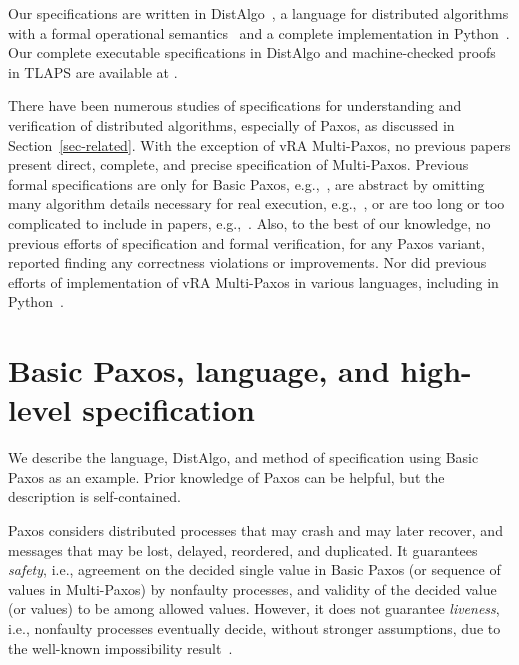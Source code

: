 \documentclass[11pt]{article}
\newcommand{\defn}[1]{\textit{#1}} %
\newcommand{\mysec}[1]{\section{#1}}
\begin{document}
Our specifications are written in DistAlgo~\cite{distalgo17lang}, a language
for distributed algorithms with a formal operational
semantics~\cite{Liu+17DistPL-TOPLAS} and a complete implementation in 
Python~\cite{Liu+12DistPL-OOPSLA,distalgo18git}. 
Our complete executable specifications in DistAlgo and machine-checked
proofs in TLAPS are available at
\anonymous{}%
.

There have been numerous studies of specifications for understanding and
verification of distributed algorithms, especially of Paxos, as discussed
in Section~\ref{sec-related}.  With the exception of vRA Multi-Paxos, no
previous papers present direct, complete, and precise specification of
Multi-Paxos.  Previous formal specifications are only for Basic Paxos,
e.g.,~\cite{kellomaki2004ann,BudSandboxPaxos}, %
are abstract by omitting many algorithm details necessary for real
execution, e.g.,~\cite{Cha+16PaxosTLAPS-FM,padon2017paxos}, or are too long
or too complicated to include in papers,
e.g.,~\cite{hawblitzel2015ironfleet,woos2016planning}.  Also, to the best
of our knowledge, no previous efforts of specification and formal
verification, for any Paxos variant, reported finding any correctness
violations %
or improvements. %
Nor did previous efforts of implementation of vRA Multi-Paxos in various
languages, including in Python~\cite{vra15paxos}.


\mysec{Basic Paxos, language, and high-level specification}
\label{sec-basic}

We describe the language, DistAlgo, and method of specification using Basic
Paxos as an example.  Prior knowledge of Paxos can be helpful, but the
description is self-contained.  

Paxos considers distributed processes that may crash and may later recover,
and messages that may be lost, delayed, reordered, and duplicated.  It
guarantees \defn{safety}, i.e., agreement on the decided single value in
Basic Paxos (or sequence of values in Multi-Paxos) by nonfaulty processes,
and validity of the decided value (or values) to be among allowed values.
However, it does not guarantee \defn{liveness}, i.e., nonfaulty processes
eventually decide, without stronger assumptions, due to the well-known
impossibility result~\cite{fischer85flp}.

\label{sec-basic-english}
\end{document}
